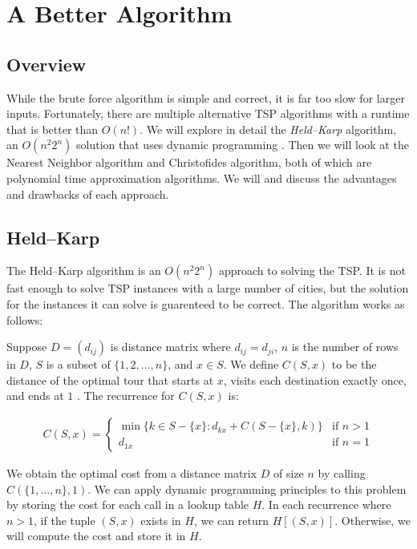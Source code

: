 \documentclass[11pt,fleqn]{article}
\begin{document}
\section{A Better Algorithm}
\subsection{Overview}
While the brute force algorithm is simple and correct, it
is far too slow for larger inputs.  Fortunately, there are multiple
alternative TSP algorithms with a runtime
that is better than $O(n!)$.  We will explore in detail the
\textit{Held--Karp} algorithm, an $O(n^2 2^n)$ solution that uses
dynamic programming \cite{heldkarp}.  Then we will look at the Nearest
Neighbor algorithm and Christofides algorithm, both of which are polynomial
time approximation algorithms.  We will and discuss the advantages
and drawbacks of each approach. 

\subsection{Held--Karp}
The Held--Karp algorithm is an $O(n^2 2^n)$ approach to solving the TSP\@.
It is not fast enough to solve TSP instances with a large number of
cities, but the solution for the instances it can solve is guarenteed
to be correct.  The algorithm works as follows:
\par

Suppose $D = (d_{ij})$ is distance
matrix where $d_{ij} = d_{ji}$, $n$ is the number of rows in $D$,
$S$ is a subset of $\{1, 2,\dots,n\}$, and $x\in S$.  We define $C(S, x)$
to be the distance of the optimal tour that starts at $x$, visits each
destination exactly once, and ends at $1$ \cite{heldkarp}.  The recurrence
for $C(S,x)$ is:

\begin{align*}
  C(S, x)=\begin{cases}
    \min\{k\in S-\{x\} : d_{kx} + C(S-\{x\}, k) \}  & \text{if } n>1 \\
    d_{1x}                                          & \text{if } n=1
  \end{cases}
\end{align*}

We obtain the optimal cost from a distance matrix $D$ of size $n$ by calling
$C(\{1,\dots,n\}, 1)$.  We can apply dynamic programming principles to this
problem by storing the cost for each call in a lookup table $H$.  In each
recurrence where $n>1$, if the tuple $(S, x)$ exists in $H$, we can return
$H[(S, x)]$.  Otherwise,  we will compute the cost and store it in $H$.
\par
\end{document}
